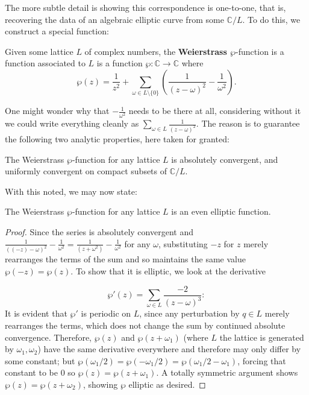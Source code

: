 The more subtle detail is showing this correspondence is one-to-one, that is, recovering the data of an algebraic elliptic curve from some $\mathbb{C} / L$. To do this, we construct a special function:

\begin{definition}
    Given some lattice $L$ of complex numbers, the \textbf{Weierstrass $\wp$}-function is a function associated to $L$ is a function $\wp: \mathbb{C} \to \mathbb{C}$ where
    \[\wp(z) = \frac{1}{z^2} + \sum_{\omega \in L \setminus \{0 \}} \left( \frac{1}{(z - \omega)^2}  - \frac{1}{\omega^2} \right).\]
\end{definition}

One might wonder why that $-\frac{1}{\omega^2}$ needs to be there at all, considering without it we could write everything cleanly as $\sum_{\omega \in L} \frac{1}{(z - \omega)^2}$. The reason is to guarantee the following two analytic properties, here taken for granted:

\begin{lemma}
    The Weierstrass $\wp$-function for any lattice $L$ is absolutely convergent, and uniformly convergent on compact subsets of $\mathbb{C} / L$.
\end{lemma}

With this noted, we may now state:

\begin{proposition}
     The Weierstrass $\wp$-function for any lattice $L$ is an even elliptic function.
\end{proposition}

\begin{proof}
    Since the series is absolutely convergent and $\frac{1}{((-z) - \omega)^2} - \frac{1}{\omega^2} = \frac{1}{(z + \omega^2)} - \frac{1}{\omega^2}$ for any $\omega$, substituting $-z$ for $z$ merely rearranges the terms of the sum and so maintains the same value $\wp(-z) = \wp(z)$. To show that it is elliptic, we look at the derivative

\[\wp'(z) = \sum_{\omega \in L}{\frac{-2}{(z - \omega)^3}}:\]
    It is evident that $\wp'$ is periodic on $L$, since any perturbation by $q \in L$ merely rearranges the terms, which does not change the sum by continued absolute convergence. Therefore, $\wp(z)$ and $\wp(z + \omega_1)$ (where $L$ the lattice is generated by $\omega_1, \omega_2$) have the same derivative everywhere and therefore may only differ by some constant; but $\wp(\omega_1/2) = \wp(- \omega_1/2) = \wp(\omega_1/2 - \omega_1)$, forcing that constant to be $0$ so $\wp(z) = \wp(z + \omega _1)$. A totally symmetric argument shows $\wp (z)  =\wp(z + \omega_2)$, showing $\wp$ elliptic as desired.   
\end{proof}

